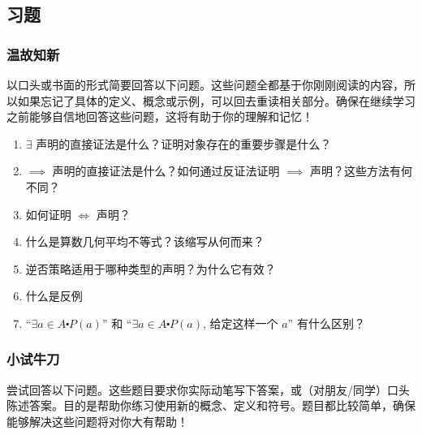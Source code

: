 \subsection{习题}\label{sec:section4.9.9}

\subsubsection*{温故知新}

以口头或书面的形式简要回答以下问题。这些问题全都基于你刚刚阅读的内容，所以如果忘记了具体的定义、概念或示例，可以回去重读相关部分。确保在继续学习之前能够自信地回答这些问题，这将有助于你的理解和记忆！

\begin{enumerate}[label=(\arabic*)]
    \item $\exists$ 声明的直接证法是什么？证明对象存在的重要步骤是什么？
    \item $\implies$ 声明的直接证法是什么？如何通过反证法证明 $\implies$ 声明？这些方法有何不同？
    \item 如何证明 $\iff$ 声明？
    \item 什么是算数几何平均不等式？该缩写从何而来？
    \item 逆否策略适用于哪种类型的声明？为什么它有效？
    \item 什么是反例
    \item ``$\exists a \in A \centerdot P(a)$'' 和 ``$\exists a \in A \centerdot P(a)$, 给定这样一个 $a$'' 有什么区别？
\end{enumerate}

\subsubsection*{小试牛刀}

尝试回答以下问题。这些题目要求你实际动笔写下答案，或（对朋友/同学）口头陈述答案。目的是帮助你练习使用新的概念、定义和符号。题目都比较简单，确保能够解决这些问题将对你大有帮助！

